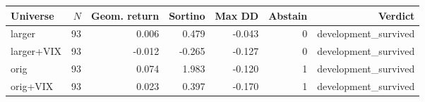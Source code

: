 \begin{tabular}{lrrrrrr}
\toprule
Universe & $N$ & Geom. return & Sortino & Max DD & Abstain & Verdict \\
\midrule
larger & 93 & 0.006 & 0.479 & -0.043 & 0 & development\_survived \\
larger+VIX & 93 & -0.012 & -0.265 & -0.127 & 0 & development\_survived \\
orig & 93 & 0.074 & 1.983 & -0.120 & 1 & development\_survived \\
orig+VIX & 93 & 0.023 & 0.397 & -0.170 & 1 & development\_survived \\
\bottomrule
\end{tabular}
